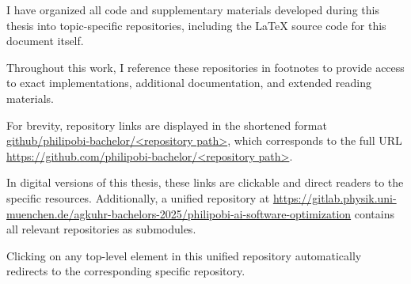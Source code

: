 \sloppy
\setlength{\parskip}{5pt}

I have organized all code and supplementary materials developed during this thesis into topic-specific repositories, including the LaTeX source code for this document itself.

Throughout this work, I reference these repositories in footnotes to provide access to exact implementations, additional documentation, and extended reading materials.

For brevity, repository links are displayed in the shortened format \uline{github/philipobi-bachelor/\textless repository path\textgreater}, which corresponds to the full URL \uline{https://github.com/philipobi-bachelor/\textless repository path\textgreater}.

In digital versions of this thesis, these links are clickable and direct readers to the specific resources.
Additionally, a unified repository at
\href{
    https://gitlab.physik.uni-muenchen.de/agkuhr-bachelors-2025/philipobi-ai-software-optimization
}{https://gitlab.physik.uni-muenchen.de/\allowbreak agkuhr-bachelors-2025/\allowbreak philipobi-ai-software-optimization} 
contains all relevant repositories as submodules.

Clicking on any top-level element in this unified repository automatically redirects to the corresponding specific repository.